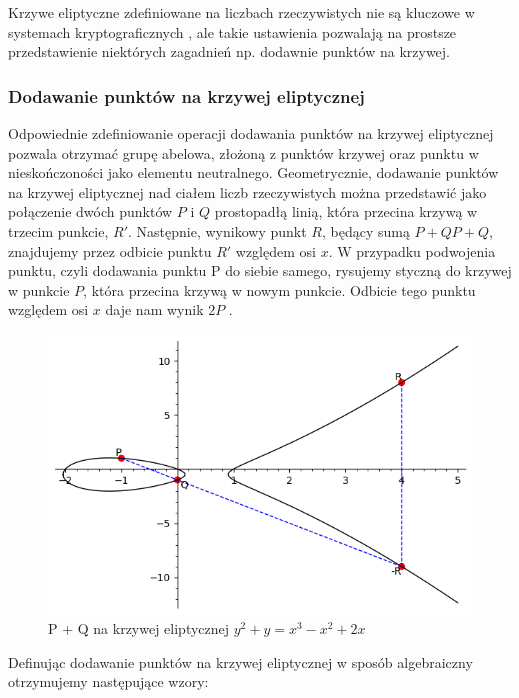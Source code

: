 Krzywe eliptyczne zdefiniowane na liczbach rzeczywistych nie są kluczowe w
systemach kryptograficznych \cite*{Stinson2021}, ale takie ustawienia
pozwalają na prostsze przedstawienie niektórych zagadnień
np. dodawnie punktów na krzywej.


\subsubsection{Dodawanie punktów na krzywej eliptycznej}
Odpowiednie zdefiniowanie operacji dodawania punktów na krzywej eliptycznej
pozwala otrzymać grupę abelowa, złożoną z punktów krzywej oraz punktu w nieskończoności jako
elementu neutralnego.
\newline
\indent
Geometrycznie, dodawanie punktów na krzywej eliptycznej nad ciałem liczb rzeczywistych można przedstawić
jako połączenie dwóch punktów $P$ i $Q$ prostopadłą linią, która przecina krzywą w trzecim
punkcie, $R'$. Następnie, wynikowy punkt $R$, będący sumą $P+QP+Q$, znajdujemy przez
odbicie punktu $R'$ względem osi $x$. W przypadku podwojenia punktu, czyli dodawania
punktu P do siebie samego, rysujemy styczną do krzywej w punkcie $P$, która przecina
krzywą w nowym punkcie. Odbicie tego punktu względem osi $x$ daje nam wynik $2P$ \cite{Chrzeszczyk2010}\cite{Stinson2021}.
\begin{figure}[!h]
    \centering \includegraphics[width=0.8\linewidth]{sage/elliptic_rational_point_addition.png}
    \caption{P + Q na krzywej eliptycznej $y^2+y=x^3-x^2+2x$}
\end{figure}
\par
Definując dodawanie punktów na krzywej eliptycznej w sposób algebraiczny otrzymujemy następujące wzory:
